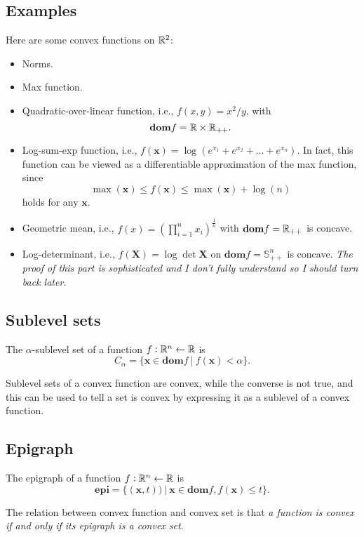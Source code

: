 \subsection{Examples}
Here are some convex functions on $\mathbb{R}^2$:
\begin{itemize}
  \item Norms.
  \item Max function.
  \item Quadratic-over-linear function, i.e., $f(x,y)=x^2/y$, with 
    \begin{equation*}
      \mathbf{dom}f=\mathbb{R} \times \mathbb{R_{++}}.
    \end{equation*}
  \item Log-sum-exp function, i.e., $f(\mathbf{x})=\log (e^{x_1}+
  e^{x_2}+\dots + e^{x_n})$. In fact, this function can be viewed
  as a differentiable approximation of the max function, since
    \begin{equation}
      \max (\mathbf{x}) \leq f(\mathbf{x}) \leq \max (\mathbf{x})+
      \log (n)
    \end{equation}
  holds for any $\mathbf{x}$.
  \item Geometric mean, i.e., $f(x)=(\prod_{i=1}^{n}x_i)^{\frac{1}
  {n}}$ with $\mathbf{dom}f=\mathbb{R}_{++}$ is concave.
  \item Log-determinant, i.e., $f(\mathbf{X})=\log \det \mathbf{X}$
  on $\mathbf{dom}f=\mathbb{S}^n_{++}$ is concave. \emph{The proof 
  of this part is sophisticated and I don't fully understand so I
  should turn back later.}
\end{itemize}

\subsection{Sublevel sets}
\begin{defn}
  The $\alpha$-sublevel set of a function $f:\mathbb{R}^n 
  \leftarrow \mathbb{R}$ is
  \begin{equation*}
    C_\alpha=\{\mathbf{x}\in \mathbf{dom}f\ |\ f(\mathbf{x}) <
    \alpha\}.
  \end{equation*}
\end{defn}
Sublevel sets of a convex function are convex, while the converse is 
not true, and this can be used to tell a set is convex by expressing 
it as a sublevel of a convex function.

\subsection{Epigraph}
\begin{defn}
  The epigraph of a function $f:\mathbb{R}^n \leftarrow
  \mathbb{R}$ is
  \begin{equation*}
    \mathbf{epi}=\{(\mathbf{x}, t))\ |\ \mathbf{x}\in
    \mathbf{dom}f, f(\mathbf{x}) \leq t\}.
  \end{equation*}
\end{defn}
The relation between convex function and convex set is that \emph{
a function is convex if and only if its epigraph is a convex set}.